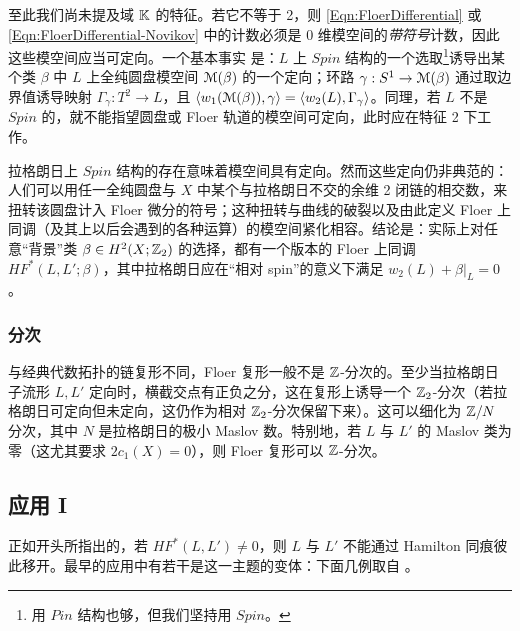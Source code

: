 至此我们尚未提及域 $\mathbb{K}$ 的特征。若它不等于 2，则 \eqref{Eqn:FloerDifferential} 或 \eqref{Eqn:FloerDifferential-Novikov} 中的计数必须是 0 维模空间的\emph{带符号}计数，因此这些模空间应当可定向。一个基本事实 \cite{deSilva,FO3} 是：$L$ 上 $Spin$ 结构的一个选取\footnote{用 $Pin$ 结构也够，但我们坚持用 $Spin$。}诱导出某个类 $\beta$ 中 $L$ 上全纯圆盘模空间 $\EuScript{M}(\beta)$ 的一个定向；环路 $\gamma: S^1 \rightarrow \EuScript{M}(\beta)$ 通过取边界值诱导映射 $\Gamma_{\gamma}: T^2 \rightarrow L$，且 $\langle w_1(\EuScript{M}(\beta)), \gamma\rangle = \langle w_2(L), \Gamma_{\gamma}\rangle$。同理，若 $L$ 不是 $Spin$ 的，就不能指望圆盘或 Floer 轨道的模空间可定向，此时应在特征 2 下工作。

拉格朗日上 $Spin$ 结构的存在意味着模空间具有定向。然而这些定向仍非典范的：人们可以用任一全纯圆盘与 $X$ 中某个与拉格朗日不交的余维 2 闭链的相交数，来扭转该圆盘计入 Floer 微分的符号；这种扭转与曲线的破裂以及由此定义 Floer 上同调（及其上以后会遇到的各种运算）的模空间紧化相容。结论是：实际上对任意“背景”类 $\beta \in H^2(X;\mathbb{Z}_2)$ 的选择，都有一个版本的 Floer 上同调 $HF^*(L,L';\beta)$，其中拉格朗日应在“相对 spin”的意义下满足 $w_2(L) + \beta|_L = 0$。

\subsubsection{分次} 与经典代数拓扑的链复形不同，Floer 复形一般不是 $\mathbb{Z}$-分次的。至少当拉格朗日子流形 $L, L'$ 定向时，横截交点有正负之分，这在复形上诱导一个 $\mathbb{Z}_2$-分次（若拉格朗日可定向但未定向，这仍作为相对 $\mathbb{Z}_2$-分次保留下来）。这可以细化为 $\mathbb{Z}/N$ 分次，其中 $N$ 是拉格朗日的极小 Maslov 数。特别地，若 $L$ 与 $L'$ 的 Maslov 类为零（这尤其要求 $2c_1(X)=0$），则 Floer 复形可以 $\mathbb{Z}$-分次。

\subsection{应用 I}\label{Sec:Appl1} 正如开头所指出的，若 $HF^*(L,L') \neq 0$，则 $L$ 与 $L'$ 不能通过 Hamilton 同痕彼此移开。最早的应用中有若干是这一主题的变体：下面几例取自 \cite{Lalonde-Sikorav, FSS2, Polterovich}。

